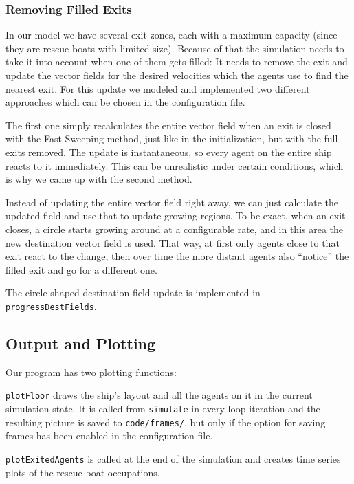 \documentclass[11pt]{article}
\begin{document}
\subsubsection{Removing Filled Exits}
\label{sub:exitremove}

In our model we have several exit zones, each with a maximum capacity (since
they are rescue boats with limited size).  Because of that the simulation needs
to take it into account when one of them gets filled: It needs to remove the
exit and update the vector fields for the desired velocities which the agents
use to find the nearest exit.  For this update we modeled and implemented two
different approaches which can be chosen in the configuration file.

The first one simply recalculates the entire vector field when an exit is
closed with the Fast Sweeping method, just like in the initialization, but with
the full exits removed.  The update is instantaneous, so every agent on the
entire ship reacts to it immediately.  This can be unrealistic under certain
conditions, which is why we came up with the second method.

Instead of updating the entire vector field right away, we can just calculate
the updated field and use that to update growing regions.  To be exact, when an
exit closes, a circle starts growing around at a configurable rate, and in this
area the new destination vector field is used.  That way, at first only agents
close to that exit react to the change, then over time the more distant agents
also ``notice'' the filled exit and go for a different one.

The circle-shaped destination field update is implemented in
\texttt{progressDestFields}.

\subsection{Output and Plotting}
\label{sub:output}

Our program has two plotting functions:

\texttt{plotFloor} draws the ship's layout and all the agents on it in the
current simulation state.  It is called from \texttt{simulate} in every loop
iteration and the resulting picture is saved to \texttt{code/frames/}, but only
if the option for saving frames has been enabled in the configuration file.

\texttt{plotExitedAgents} is called at the end of the simulation and creates
time series plots of the rescue boat occupations.
\end{document}
